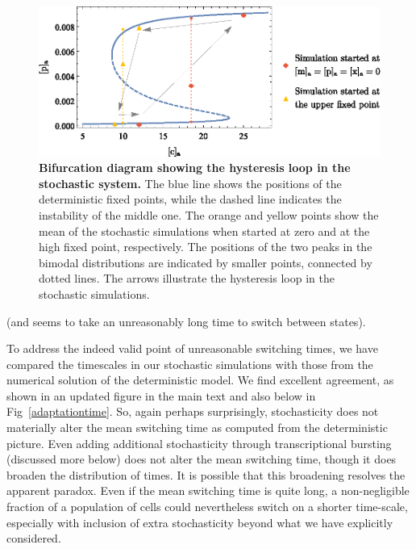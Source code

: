\documentclass[11pt,letterpaper]{article}
\begin{document}
\begin{figure}[h!]
	\centering
	\includegraphics{Fig10_bifurcation.eps}
	\caption{{\bf Bifurcation diagram showing the hysteresis loop in the stochastic system.}
		The blue line shows the positions of the deterministic fixed points, while the dashed line indicates the instability of the middle one. The orange and yellow points show the mean of the stochastic simulations when started at zero and at the high fixed point, respectively. The positions of the two peaks in the bimodal distributions are indicated by smaller points, connected by dotted lines. The arrows illustrate the hysteresis loop in the stochastic simulations.}
	\label{bifucation}
\end{figure}

\begin{review}
	(and seems to take an unreasonably long time to switch between states).
\end{review}

\begin{response}
To address the indeed valid point of unreasonable switching times, we
have compared the timescales in our stochastic simulations with those from the
numerical solution of the deterministic model. We find excellent
agreement, as shown in an updated figure in the main text and also below
in Fig~\ref{adaptationtime}. So, again perhaps surprisingly,
stochasticity does not materially alter the mean switching time as
computed from the deterministic picture. Even adding additional
stochasticity through transcriptional bursting (discussed more below)
does not alter the mean switching time, though it does broaden the
distribution of times.
It is possible that this broadening resolves the apparent paradox. Even
if the mean switching time is quite long, a non-negligible fraction of a
population of cells could nevertheless switch on a shorter time-scale,
especially with inclusion of extra stochasticity beyond what we have
explicitly considered.
\end{response}
\end{document}
